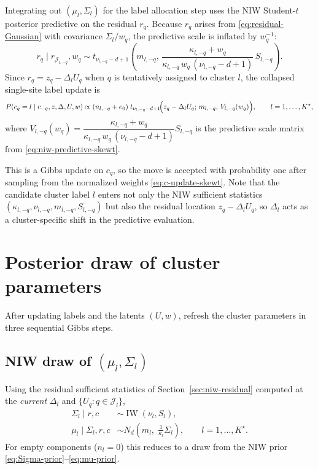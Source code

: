 \documentclass[11pt]{article}
\DeclareMathOperator{\IW}{IW}
\begin{document}
Integrating out $(\mu_l,\Sigma_l)$ for the label allocation step uses the
NIW Student-$t$ posterior predictive on the residual $r_q$.  Because $r_q$
arises from \eqref{eq:residual-Gaussian} with covariance $\Sigma_l/w_q$,
the predictive scale is inflated by $w_q^{-1}$:
\begin{equation}
    r_q\mid r_{\mathcal J_{l,-q}},w_q
    \sim
    t_{\nu_{l,-q}-d+1}
    \!\left(
    m_{l,-q},\,
    \frac{\kappa_{l,-q}+w_q}{\kappa_{l,-q}\,w_q\,(\nu_{l,-q}-d+1)}\,S_{l,-q}
    \right).
    \label{eq:niw-predictive-skewt}
\end{equation}
Since $r_q=z_q-\Delta_l U_q$ when $q$ is tentatively assigned to cluster
$l$, the collapsed single-site label update is
\begin{equation}
    P(c_q=l\mid c_{-q},z,\Delta,U,w)
    \propto
    (n_{l,-q}+e_0)\;
    t_{\nu_{l,-q}-d+1}\!\Bigl(
        z_q-\Delta_l U_q;\,m_{l,-q},\,V_{l,-q}(w_q)
    \Bigr),
    \qquad l=1,\dots,K^\star,
    \label{eq:c-update-skewt}
\end{equation}
where $V_{l,-q}(w_q)=\dfrac{\kappa_{l,-q}+w_q}{\kappa_{l,-q}\,w_q\,(\nu_{l,-q}-d+1)}S_{l,-q}$
is the predictive scale matrix from \eqref{eq:niw-predictive-skewt}.

This is a Gibbs update on $c_q$, so the move is accepted with probability
one after sampling from the normalized weights \eqref{eq:c-update-skewt}.
Note that the candidate cluster label $l$ enters not only the NIW
sufficient statistics $(\kappa_{l,-q},\nu_{l,-q},m_{l,-q},S_{l,-q})$ but
also the residual location $z_q-\Delta_l U_q$, so $\Delta_l$ acts as a
cluster-specific shift in the predictive evaluation.

\section{Posterior draw of cluster parameters}
\label{sec:cluster-param-update}

After updating labels and the latents $(U,w)$, refresh the cluster
parameters in three sequential Gibbs steps.

\subsection{NIW draw of $(\mu_l,\Sigma_l)$}

Using the residual sufficient statistics of Section~\ref{sec:niw-residual}
computed at the \emph{current} $\Delta_l$ and $\{U_q:q\in\mathcal J_l\}$,
\begin{align}
    \Sigma_l\mid r,c
    &\sim\IW(\nu_l,S_l),
    \label{eq:Sigma-post}\\
    \mu_l\mid\Sigma_l,r,c
    &\sim N_d\!\left(m_l,\;\frac{1}{\kappa_l}\Sigma_l\right),
    \qquad l=1,\dots,K^\star.
    \label{eq:mu-post}
\end{align}
For empty components ($n_l=0$) this reduces to a draw from the NIW prior
\eqref{eq:Sigma-prior}--\eqref{eq:mu-prior}.
\end{document}
